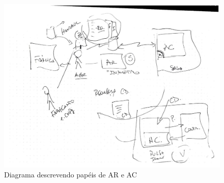 \documentclass[12pt]{article}
\begin{document}
\begin{figure}[ht]
\centering
\includegraphics[width=1\textwidth]{ruy.pdf}
\caption{Diagrama descrevendo papéis de AR e AC}
\label{f:ruy}
\end{figure}


% 
% 
% 
% 



\end{document}
